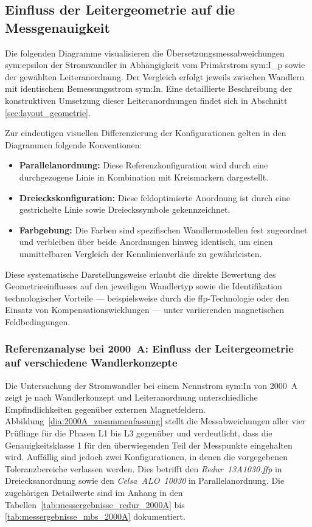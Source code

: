 \subsection{Einfluss der Leitergeometrie auf die Messgenauigkeit}
\label{sec:einfluss_leitergeometrie}

Die folgenden Diagramme visualisieren die Übersetzungsmessabweichungen \gls{sym:epsilon} der Stromwandler in Abhängigkeit vom Primärstrom \gls{sym:I_p} sowie der gewählten Leiteranordnung. Der Vergleich erfolgt jeweils zwischen Wandlern mit identischem Bemessungsstrom \gls{sym:In}. Eine detaillierte Beschreibung der konstruktiven Umsetzung dieser Leiteranordnungen findet sich in Abschnitt \ref{sec:layout_geometrie}.



Zur eindeutigen visuellen Differenzierung der Konfigurationen gelten in den Diagrammen folgende Konventionen:

\begin{itemize}
    \item \textbf{Parallelanordnung:} Diese Referenzkonfiguration wird durch eine durchgezogene Linie in Kombination mit Kreismarkern dargestellt.
    \item \textbf{Dreieckskonfiguration:} Diese feldoptimierte Anordnung ist durch eine gestrichelte Linie sowie Dreieckssymbole gekennzeichnet.
    \item \textbf{Farbgebung:} Die Farben sind spezifischen Wandlermodellen fest zugeordnet und verbleiben über beide Anordnungen hinweg identisch, um einen unmittelbaren Vergleich der Kennlinienverläufe zu gewährleisten.
\end{itemize}



Diese systematische Darstellungsweise erlaubt die direkte Bewertung des Geometrieeinflusses auf den jeweiligen Wandlertyp sowie die Identifikation technologischer Vorteile — beispielsweise durch die \gls{ffp}-Technologie oder den Einsatz von Kompensationswicklungen — unter variierenden magnetischen Feldbedingungen.



\subsubsection{Referenzanalyse bei \SI{2000}{A}: Einfluss der Leitergeometrie auf verschiedene Wandlerkonzepte}
\label{sec:analyse_messreihe_2000A}

Die Untersuchung der Stromwandler bei einem Nennstrom \gls{sym:In} von \SI{2000}{A} zeigt je nach Wandlerkonzept und Leiteranordnung unterschiedliche Empfindlichkeiten gegenüber externen Magnetfeldern. Abbildung~\ref{dia:2000A_zusammenfassung} stellt die Messabweichungen aller vier Prüflinge für die Phasen L1 bis L3 gegenüber und verdeutlicht, dass die Genauigkeitsklasse \num{1} für den überwiegenden Teil der Messpunkte eingehalten wird. Auffällig sind jedoch zwei Konfigurationen, in denen die vorgegebenen Toleranzbereiche verlassen werden. Dies betrifft den \textit{Redur~13A1030.ffp} in Dreiecksanordnung sowie den \textit{Celsa~ALO~10030} in Parallelanordnung. Die zugehörigen Detailwerte sind im Anhang in den Tabellen~\ref{tab:messergebnisse_redur_2000A} bis \ref{tab:messergebnisse_mbs_2000A} dokumentiert.


